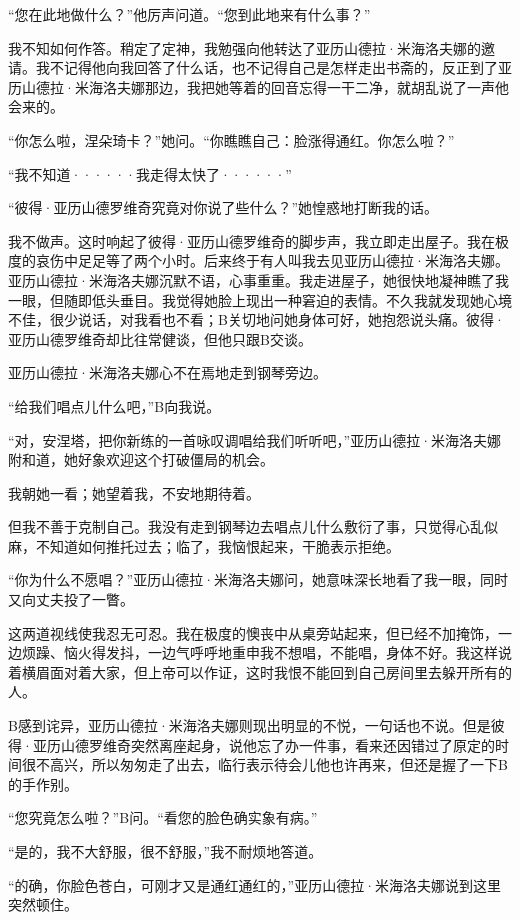 \documentclass[12pt, UTF8]{ctexbook}
\begin{document}
\par “您在此地做什么？”他厉声问道。“您到此地来有什么事？”
\par 我不知如何作答。稍定了定神，我勉强向他转达了亚历山德拉·米海洛夫娜的邀请。我不记得他向我回答了什么话，也不记得自己是怎样走出书斋的，反正到了亚历山德拉·米海洛夫娜那边，我把她等着的回音忘得一干二净，就胡乱说了一声他会来的。
\par “你怎么啦，涅朵琦卡？”她问。“你瞧瞧自己：脸涨得通红。你怎么啦？”
\par “我不知道······我走得太快了······”
\par “彼得·亚历山德罗维奇究竟对你说了些什么？”她惶惑地打断我的话。
\par 我不做声。这时响起了彼得·亚历山德罗维奇的脚步声，我立即走出屋子。我在极度的哀伤中足足等了两个小时。后来终于有人叫我去见亚历山德拉·米海洛夫娜。亚历山德拉·米海洛夫娜沉默不语，心事重重。我走进屋子，她很快地凝神瞧了我一眼，但随即低头垂目。我觉得她脸上现出一种窘迫的表情。不久我就发现她心境不佳，很少说话，对我看也不看；B关切地问她身体可好，她抱怨说头痛。彼得·亚历山德罗维奇却比往常健谈，但他只跟B交谈。
\par 亚历山德拉·米海洛夫娜心不在焉地走到钢琴旁边。
\par “给我们唱点儿什么吧，”B向我说。
\par “对，安涅塔，把你新练的一首咏叹调唱给我们听听吧，”亚历山德拉·米海洛夫娜附和道，她好象欢迎这个打破僵局的机会。
\par 我朝她一看；她望着我，不安地期待着。
\par 但我不善于克制自己。我没有走到钢琴边去唱点儿什么敷衍了事，只觉得心乱似麻，不知道如何推托过去；临了，我恼恨起来，干脆表示拒绝。
\par “你为什么不愿唱？”亚历山德拉·米海洛夫娜问，她意味深长地看了我一眼，同时又向丈夫投了一瞥。
\par 这两道视线使我忍无可忍。我在极度的懊丧中从桌旁站起来，但已经不加掩饰，一边烦躁、恼火得发抖，一边气呼呼地重申我不想唱，不能唱，身体不好。我这样说着横眉面对着大家，但上帝可以作证，这时我恨不能回到自己房间里去躲开所有的人。
\par B感到诧异，亚历山德拉·米海洛夫娜则现出明显的不悦，一句话也不说。但是彼得·亚历山德罗维奇突然离座起身，说他忘了办一件事，看来还因错过了原定的时间很不高兴，所以匆匆走了出去，临行表示待会儿他也许再来，但还是握了一下B的手作别。
\par “您究竟怎么啦？”B问。“看您的脸色确实象有病。”
\par “是的，我不大舒服，很不舒服，”我不耐烦地答道。
\par “的确，你脸色苍白，可刚才又是通红通红的，”亚历山德拉·米海洛夫娜说到这里突然顿住。
\end{document}
